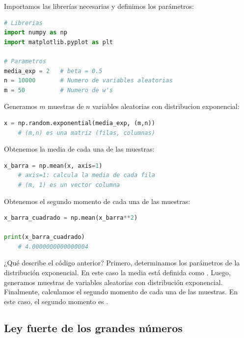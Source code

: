 \documentclass[8pt]{article}
\newcommand{\code}[1]{\texttt{\color{frenchplum}{#1}}}
\begin{document}
\vspace*{0.3cm}

Importamos las librerías necesarias y definimos los parámetros:

\begin{lstlisting}[language=Python]
# Librerias
import numpy as np
import matplotlib.pyplot as plt

# Parametros
media_exp = 2   # beta = 0.5
n = 10000       # Numero de variables aleatorias
m = 50          # Numero de w's
\end{lstlisting}

Generamos $m$ muestras de $n$ variables aleatorias con distribucion exponencial:

\begin{lstlisting}[language=Python]
x = np.random.exponential(media_exp, (m,n))
    # (m,n) es una matriz (filas, columnas)
\end{lstlisting}

Obtenemos la media de cada una de las muestras:

\begin{lstlisting}[language=Python]
x_barra = np.mean(x, axis=1)
    # axis=1: calcula la media de cada fila
    # (m, 1) es un vector columna
\end{lstlisting}

Obtenemos el segundo momento de cada una de las muestras:

\begin{lstlisting}[language=Python]
x_barra_cuadrado = np.mean(x_barra**2)

print(x_barra_cuadrado)
    # 4.0000000000000004
\end{lstlisting}

\vspace*{0.3cm}

¿Qué describe el código anterior? Primero, determinamos los parámetros de la distribución exponencial. En este caso la media está definida como \code{media\_exp = 2}. Luego, generamos \code{m} muestras de \code{n} variables aleatorias con distribución exponencial. Finalmente, calculamos el segundo momento de cada una de las muestras. En este caso, el segundo momento es \code{4.0000000000000004}.





\subsection{Ley fuerte de los grandes números}
\end{document}
